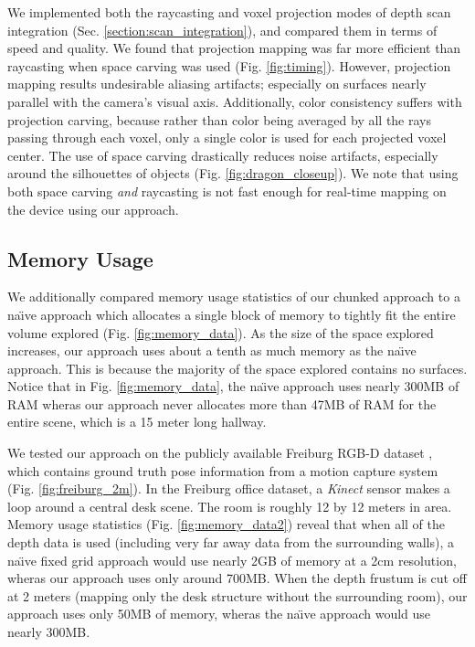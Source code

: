 \documentclass[10pt,twocolumn,letterpaper]{article}
\begin{document}
 
We implemented both the raycasting and voxel projection modes of depth scan
integration (Sec. \ref{section:scan_integration}), and compared them in terms of
speed and quality. We found that projection mapping was far more efficient than
raycasting when space carving was used (Fig. \ref{fig:timing}). However,
projection mapping results undesirable aliasing artifacts; especially on
surfaces nearly parallel with the camera's visual axis. Additionally, color consistency suffers
with projection carving, because rather than color being averaged by all the
rays passing through each voxel, only a single color is used for each projected
voxel center. The use of space carving drastically reduces noise artifacts,
especially around the silhouettes of objects (Fig. \ref{fig:dragon_closeup}). We
note that using both space carving \emph{and} raycasting is not fast enough for real-time mapping on the device
using our approach.

\subsection{Memory Usage}
We additionally compared memory usage statistics of our chunked approach to a
na\"{\i}ve approach which allocates a single block of memory to tightly fit the
entire volume explored (Fig. \ref{fig:memory_data}). As the size of the space
explored increases, our approach uses about a tenth as much memory as the
na\"{\i}ve approach. This is because the majority of the space explored contains no
surfaces. Notice that in Fig. \ref{fig:memory_data}, the na\"{\i}ve approach uses
nearly 300MB of RAM wheras our approach never allocates more than 47MB of RAM
for the entire scene, which is a 15 meter long hallway.

We tested our approach on the publicly available Freiburg RGB-D dataset
\cite{FREIBURG}, which contains ground truth pose information from a motion
capture system (Fig. \ref{fig:freiburg_2m}). In the Freiburg office dataset, a
\textit{Kinect} sensor makes a loop around a central desk scene. The room is
roughly 12 by 12 meters in area.  Memory usage statistics (Fig.
\ref{fig:memory_data2}) reveal that when all of the depth data is used
(including very far away data from the surrounding walls), a na\"{\i}ve fixed grid
approach would use nearly 2GB of memory at a 2cm resolution, wheras our
approach uses only around 700MB. When the depth frustum is cut off at 2 meters
(mapping only the desk structure without the surrounding room), our approach
uses only 50MB of memory, wheras the na\"{\i}ve approach would use nearly 300MB.
\end{document}
